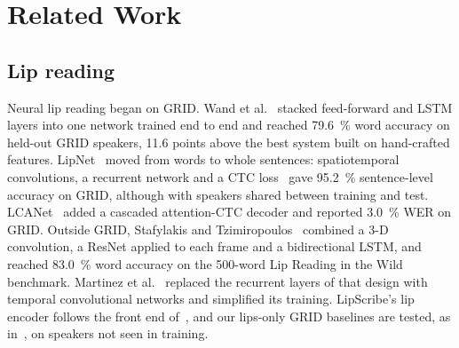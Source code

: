 \section{Related Work}
\label{sec:related}

\subsection{Lip reading}
Neural lip reading began on GRID. Wand et al.~\cite{wand2016} stacked feed-forward and LSTM
layers into one network trained end to end and reached 79.6~\% word accuracy on held-out GRID
speakers, 11.6 points above the best system built on hand-crafted features. LipNet~\cite{assael2016}
moved from words to whole sentences: spatiotemporal convolutions, a recurrent network and a CTC
loss~\cite{graves2006} gave 95.2~\% sentence-level accuracy on GRID, although with speakers shared
between training and test. LCANet~\cite{xu2018} added a cascaded attention-CTC decoder and reported
3.0~\% WER on GRID. Outside GRID, Stafylakis and Tzimiropoulos~\cite{stafylakis2017} combined a
3-D convolution, a ResNet applied to each frame and a bidirectional LSTM, and reached 83.0~\% word
accuracy on the 500-word Lip Reading in the Wild benchmark. Martinez et al.~\cite{martinez2020}
replaced the recurrent layers of that design with temporal convolutional networks and simplified
its training. LipScribe's lip encoder follows the front end of~\cite{stafylakis2017}, and our
lips-only GRID baselines are tested, as in~\cite{wand2016}, on speakers not seen in training.

